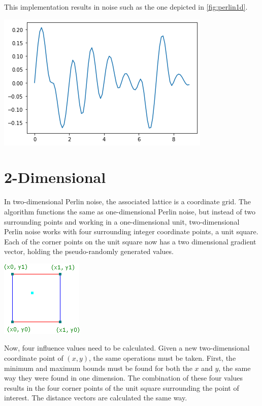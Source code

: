 \documentclass[10pt]{report}
\begin{document}
		This implementation results in noise such as the one depicted in \autoref{fig:perlin1d}.
		
		\begin{minipage}{\textwidth}
			\centering
			\includegraphics[scale=.5]{perlin1d}
			\label{fig:perlin1d}
		\end{minipage} 
	
		\section{2-Dimensional}
		
		In two-dimensional Perlin noise, the associated lattice is a coordinate grid. The algorithm functions the same as one-dimensional Perlin noise, but instead of two surrounding points and working in a one-dimensional unit, two-dimensional Perlin noise works with four surrounding integer coordinate points, a unit square. Each of the corner points on the unit square now has a two dimensional gradient vector, holding the pseudo-randomly generated values. 
		
		\begin{minipage}{\textwidth}
			\centering
			\includegraphics[scale=1.0]{cornergridpoints}
			\label{fig:cornergridpoints}
		\end{minipage} 
	
		Now, four influence values need to be calculated. Given a new two-dimensional coordinate point of \((x,y)\), the same operations must be taken. First, the minimum and maximum bounds must be found for both the \(x\) and \(y\), the same way they were found in one dimension. The combination of these four values results in the four corner points of the unit square surrounding the point of interest. The distance vectors are calculated the same way. 
		
\end{document}
